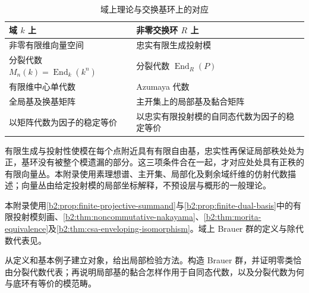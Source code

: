 \begin{table}[htbp]
	\centering
	\caption{域上理论与交换基环上的对应}
	\label{b2:tab:C-field-ring-comparison}
	\begin{tabularx}{\textwidth}{@{}XX@{}}
		\toprule
		域 \(k\) 上 & 非零交换环 \(R\) 上 \\
		\midrule
		非零有限维向量空间 & 忠实有限生成投射模 \\
		分裂代数 \(M_n(k)=\operatorname{End}_k(k^n)\) & 分裂代数 \(\operatorname{End}_R(P)\) \\
		有限维中心单代数 & Azumaya 代数 \\
		全局基及换基矩阵 & 主开集上的局部基及黏合矩阵 \\
		以矩阵代数为因子的稳定等价 & 以忠实有限投射模的自同态代数为因子的稳定等价 \\
		\bottomrule
	\end{tabularx}
\end{table}

有限生成与投射性使模在每个点附近具有有限自由基，忠实性再保证局部秩处处为正，基环没有被整个模遗漏的部分。这三项条件合在一起，才对应处处具有正秩的有限向量丛。本附录使用素理想谱、主开集、局部化及剩余域纤维的仿射代数描述；向量丛由给定投射模的局部坐标解释，不预设层与概形的一般理论。

\ProseParagraphBreak
本附录使用\cref{b2:prop:finite-projective-summand}与\cref{b2:prop:finite-dual-basis}中的有限投射模刻画、\cref{b2:thm:noncommutative-nakayama}、\cref{b2:thm:morita-equivalence}及\cref{b2:thm:csa-enveloping-isomorphism}。域上 Brauer 群的定义与除代数代表见。

\ProseParagraphBreak
{}从定义和基本例子建立对象，给出局部检验方法。构造 Brauer 群，并证明零类恰由分裂代数代表；再说明局部基的黏合怎样作用于自同态代数，以及分裂代数为何与底环有等价的模范畴。






